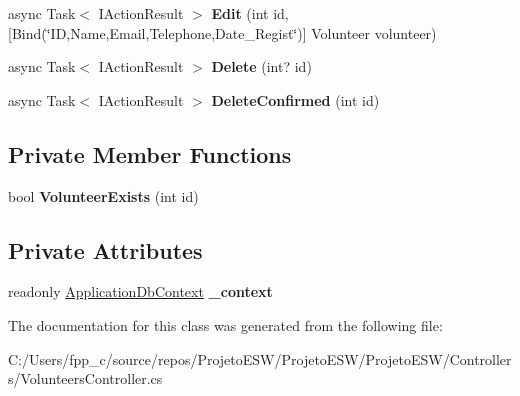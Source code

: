 \begin{DoxyCompactItemize}
async Task$<$ I\+Action\+Result $>$ {\bfseries Edit} (int id, \mbox{[}Bind(\char`\"{}ID,Name,Email,Telephone,Date\+\_\+\+Regist\char`\"{})\mbox{]} Volunteer volunteer)
\item 
\mbox{\label{class_projeto_e_s_w_1_1_controllers_1_1_volunteers_controller_ab8f0ea14c5805221f4c54fe495326d73}} 
async Task$<$ I\+Action\+Result $>$ {\bfseries Delete} (int? id)
\item 
\mbox{\label{class_projeto_e_s_w_1_1_controllers_1_1_volunteers_controller_a0e87ca0c1dc20eefe1a4f33ff3d26264}} 
async Task$<$ I\+Action\+Result $>$ {\bfseries Delete\+Confirmed} (int id)
\end{DoxyCompactItemize}
\subsection*{Private Member Functions}
\begin{DoxyCompactItemize}
\item 
\mbox{\label{class_projeto_e_s_w_1_1_controllers_1_1_volunteers_controller_afa1d22d9e6b87d0f1b2f5bc4b71da3f5}} 
bool {\bfseries Volunteer\+Exists} (int id)
\end{DoxyCompactItemize}
\subsection*{Private Attributes}
\begin{DoxyCompactItemize}
\item 
\mbox{\label{class_projeto_e_s_w_1_1_controllers_1_1_volunteers_controller_a9a0a07047bcd5c2786f2d138c2144973}} 
readonly \mbox{\hyperlink{class_projeto_e_s_w_1_1_data_1_1_application_db_context}{Application\+Db\+Context}} {\bfseries \+\_\+context}
\end{DoxyCompactItemize}


The documentation for this class was generated from the following file\+:\begin{DoxyCompactItemize}
\item 
C\+:/\+Users/fpp\+\_\+c/source/repos/\+Projeto\+E\+S\+W/\+Projeto\+E\+S\+W/\+Projeto\+E\+S\+W/\+Controllers/Volunteers\+Controller.\+cs\end{DoxyCompactItemize}
